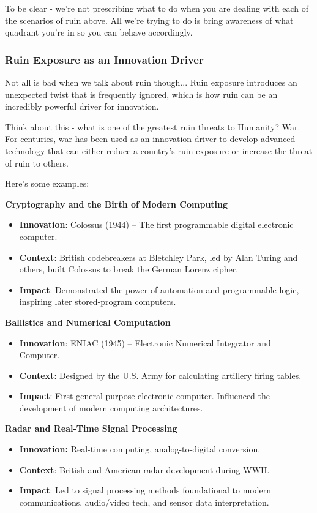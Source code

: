 To be clear - we're not prescribing what to do when you are dealing with each of the scenarios of ruin above. All we're trying to do is bring awareness of what quadrant you're in so you can behave accordingly.

\subsubsection{Ruin Exposure as an Innovation Driver}

Not all is bad when we talk about ruin though... Ruin exposure introduces an unexpected twist that is frequently ignored, which is how ruin can be an incredibly powerful driver for innovation. 

Think about this - what is one of the greatest ruin threats to Humanity? War. For centuries, war has been used as an innovation driver to develop advanced technology that can either reduce a country's ruin exposure or increase the threat of ruin to others.

Here's some examples:

\textbf{Cryptography and the Birth of Modern Computing}
\begin{itemize}
	\item \textbf{Innovation}: Colossus (1944) – The first programmable digital electronic computer.
	\item \textbf{Context}: British codebreakers at Bletchley Park, led by Alan Turing and others, built Colossus to break the German Lorenz cipher.
	\item \textbf{Impact}: Demonstrated the power of automation and programmable logic, inspiring later stored-program computers. \cite{colossus2006}
\end{itemize}

\textbf{Ballistics and Numerical Computation}
\begin{itemize}
	\item \textbf{Innovation}: ENIAC (1945) – Electronic Numerical Integrator and Computer.
	\item \textbf{Context}: Designed by the U.S. Army for calculating artillery firing tables.
	\item \textbf{Impact}: First general-purpose electronic computer. Influenced the development of modern computing architectures. \cite{montecarlo2014}
\end{itemize}

\textbf{Radar and Real-Time Signal Processing}
\begin{itemize}
	\item \textbf{Innovation:} Real-time computing, analog-to-digital conversion.
	\item \textbf{Context}: British and American radar development during WWII.
	\item \textbf{Impact}: Led to signal processing methods foundational to modern communications, audio/video tech, and sensor data interpretation. \cite{Whirlwind1980}
\end{itemize}

